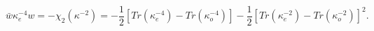 \begin{equation}
\bar{w}\kappa _{e}^{-4}w=-\chi _{2}\left( \kappa ^{-2}\right) =-\frac{1}{2}%
\left[ Tr\left( \kappa _{e}^{-4}\right) -Tr\left( \kappa _{o}^{-4}\right) 
\right] -\frac{1}{2}\left[ Tr\left( \kappa _{e}^{-2}\right) -Tr\left( \kappa
_{o}^{-2}\right) \right] ^{2}.  \label{w4w}
\end{equation}

